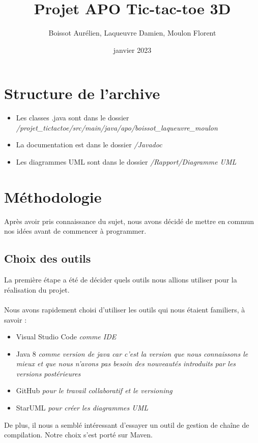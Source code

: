 \documentclass{article}
\title{Projet APO {\Large Tic-tac-toe 3D}}
\author{Boissot Aurélien, Laqueuvre Damien, Moulon Florent}
\date{janvier 2023}
\begin{document}
\maketitle

\renewcommand{\contentsname}{Table des matières}
\tableofcontents
\newpage

\section{Structure de l'archive}
\begin{itemize}
    \item Les classes .java sont dans le dossier \textit{ /projet\_tictactoe/src/main/java/apo/boissot\_laqueuvre\_moulon}
    \item La documentation est dans le dossier \textit{ /Javadoc}
    \item Les diagrammes UML sont dans le dossier \textit{ /Rapport/Diagramme UML}
\end{itemize}



\section{Méthodologie}
Après avoir pris connaissance du sujet, nous avons décidé de mettre en commun nos idées avant de commencer à programmer.

\subsection{Choix des outils}
 La première étape a été de décider quels outils nous allions utiliser pour la réalisation du projet.\\ \\
 
 Nous avons rapidement choisi d'utiliser les outils qui nous étaient familiers, à savoir :
 \begin{itemize}
    \item Visual Studio Code \textit{comme IDE}
    \item Java 8 \textit{comme version de java car c'est la version que nous connaissons le mieux et que nous n'avons pas besoin des nouveautés introduits par les versions postérieures}
    \item GitHub \textit{pour le travail collaboratif et le versioning}
    \item StarUML \textit{pour créer les diagrammes UML}
\end{itemize}
De plus, il nous a semblé intéressant d'essayer un outil de gestion de chaîne de compilation. Notre choix s'est porté sur Maven.\\
\end{document}
